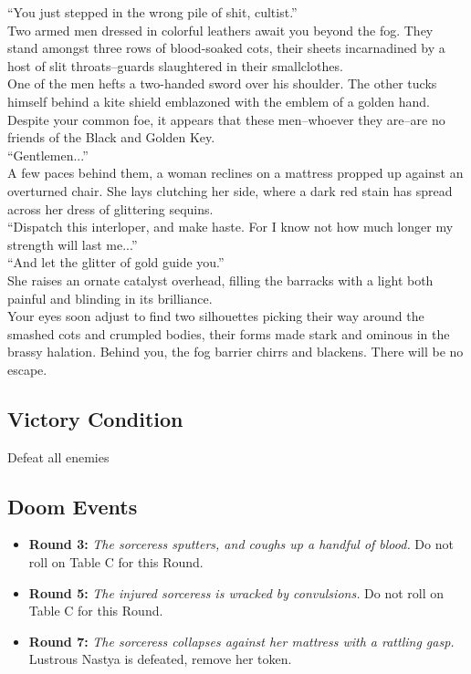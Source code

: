 “You just stepped in the wrong pile of shit, cultist.”\\

Two armed men dressed in colorful leathers await you beyond the fog. They stand amongst three rows of blood-soaked cots, their sheets incarnadined by a host of slit throats--guards slaughtered in their smallclothes.\\

One of the men hefts a two-handed sword over his shoulder. The other tucks himself behind a kite shield emblazoned with the emblem of a golden hand. Despite your common foe, it appears that these men--whoever they are--are no friends of the Black and Golden Key.\\

“Gentlemen...”\\

A few paces behind them, a woman reclines on a mattress propped up against an overturned chair. She lays clutching her side, where a dark red stain has spread across her dress of glittering sequins.\\

“Dispatch this interloper, and make haste. For I know not how much longer my strength will last me...”\\

“And let the glitter of gold guide you.”\\
She raises an ornate catalyst overhead, filling the barracks with a light both painful and blinding in its brilliance.\\

Your eyes soon adjust to find two silhouettes picking their way around the smashed cots and crumpled bodies, their forms made stark and ominous in the brassy halation. Behind you, the fog barrier chirrs and blackens. There will be no escape.\\

\subsection*{Victory Condition}
Defeat all enemies

\subsection*{Doom Events}
\begin{itemize}
\item \textbf{Round 3:} \emph{The sorceress sputters, and coughs up a handful of blood.} Do not roll on Table C for this Round.
\item \textbf{Round 5:} \emph{The injured sorceress is wracked by convulsions.} Do not roll on Table C for this Round.
\item \textbf{Round 7:} \emph{The sorceress collapses against her mattress with a rattling gasp.} Lustrous Nastya is defeated, remove her token.
\end{itemize}

